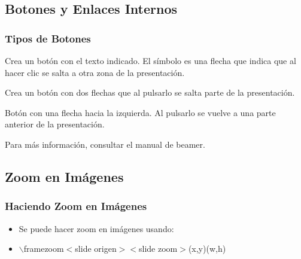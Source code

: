 \documentclass[aspectratio=43]{beamer}%
\begin{document}
\subsection{Botones y Enlaces Internos}
\begin{frame}[fragile]
\frametitle{\textbf{Tipos de Botones}}
\justifying
 \begin{description}\justifying
  \item[$\backslash$beamergotobutton texto] Crea un botón con el texto indicado. El símbolo es una flecha que indica que al hacer clic se salta a otra zona de la presentación.
  \item[$\backslash$beamerskipbutton texto] Crea un botón con dos flechas que al pulsarlo se salta parte de la presentación.
  \item[$\backslash$beamerreturnbutton texto] Botón con una flecha hacia la izquierda. Al pulsarlo se vuelve a una parte anterior de la presentación.
\end{description}
Para más información, consultar el manual de beamer.
\end{frame}

\subsection{Zoom en Imágenes}
\begin{frame}[fragile]
\frametitle{\textbf{Haciendo Zoom en Imágenes}}
\justifying
 \begin{itemize}\justifying
  \item Se puede hacer zoom en imágenes usando:
  \item [] $\backslash$framezoom$<$slide origen$><$slide zoom$>$(x,y)(w,h)

\end{itemize}

\end{frame}
\end{document}
